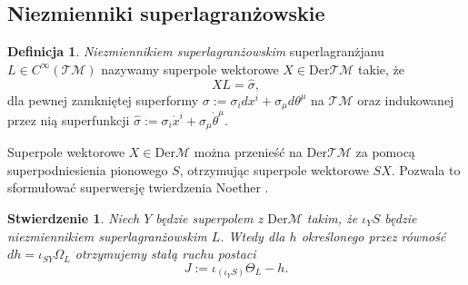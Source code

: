 \documentclass[11pt,a4paper]{report}
\newtheorem{proposition}[theorem]{Stwierdzenie}
\theoremstyle{definition}
\newtheorem{definition}[theorem]{Definicja}
\begin{document}
\subsection{Niezmienniki superlagranżowskie}

\begin{definition}
 \textit{Niezmiennikiem superlagranżowskim} superlagranżjanu $L\in C^\infty (\mathcal{TM})$ nazywamy superpole wektorowe $X \in \mathrm{Der} \mathcal{TM}$ takie, że
 \begin{equation*}
  XL = \widehat{\sigma},
 \end{equation*}
 dla pewnej zamkniętej superformy $\sigma := \sigma_i dx^i + \sigma_\mu d\theta^\mu$ na $\mathcal{TM}$ oraz indukowanej przez nią superfunkcji $\widehat \sigma := \sigma_i \dot x^i + \sigma_\mu \dot \theta^\mu$.
\end{definition}

Superpole wektorowe $X\in \mathrm{Der} \mathcal{M}$ można przenieść na $\mathrm{Der} \mathcal{TM}$ za pomocą superpodniesienia pionowego $S$, otrzymując superpole wektorowe $SX$. Pozwala to sformułować superwersję twierdzenia Noether \cite{carinena2}.

\begin{proposition}
 Niech $Y$ będzie superpolem z $\mathrm{Der} \mathcal{M}$ takim, że $\iota_Y S$ będzie niezmiennikiem superlagranżowskim $L$. Wtedy dla $h$ określonego przez równość $dh = \iota_{SY} \Omega_L$ otrzymujemy stałą ruchu postaci
 \begin{equation*}
  J:= \iota_{(\iota_Y S)} \Theta_L - h.
 \end{equation*}
\end{proposition}
\end{document}
